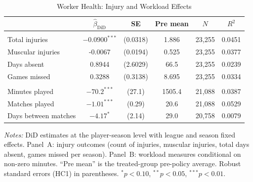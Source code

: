 \begin{table}[htbp]
\centering
\begin{threeparttable}
\caption{Worker Health: Injury and Workload Effects}
\label{tab:worker_health}
\begin{tabular}{lccccc}
\toprule
& $\hat{\beta}_{\text{DiD}}$ & SE & Pre mean & $N$ & $R^2$ \\
\midrule
\addlinespace
\multicolumn{6}{l}{\textit{Panel A: Injury outcomes (player-season)}} \\
\addlinespace[3pt]
\quad Total injuries & $-0.0900^{***}$ & (0.0318) & 1.886 & 23,255 & 0.0451 \\
\quad Muscular injuries & -0.0067 & (0.0194) & 0.525 & 23,255 & 0.0377 \\
\quad Days absent & 0.8944 & (2.6029) & 66.5 & 23,255 & 0.0239 \\
\quad Games missed & 0.3288 & (0.3138) & 8.695 & 23,255 & 0.0334 \\
\addlinespace
\multicolumn{6}{l}{\textit{Panel B: Workload (player-season)}} \\
\addlinespace[3pt]
\quad Minutes played & $-70.2^{***}$ & (27.1) & 1505.4 & 21,088 & 0.0387 \\
\quad Matches played & $-1.01^{***}$ & (0.29) & 20.6 & 21,088 & 0.0529 \\
\quad Days between matches & $-4.17^{*}$ & (2.14) & 29.0 & 20,758 & 0.0079 \\
\bottomrule
\end{tabular}
\begin{tablenotes}[flushleft]
\footnotesize
\item \textit{Notes:} DiD estimates at the player-season level with league and season fixed
effects. Panel~A: injury outcomes (count of injuries, muscular injuries, total days absent,
games missed per season). Panel~B: workload measures conditional on non-zero minutes.
``Pre mean'' is the treated-group pre-policy average. Robust standard errors (HC1) in
parentheses. $^{*}p<0.10$, $^{**}p<0.05$, $^{***}p<0.01$.
\end{tablenotes}
\end{threeparttable}
\end{table}
